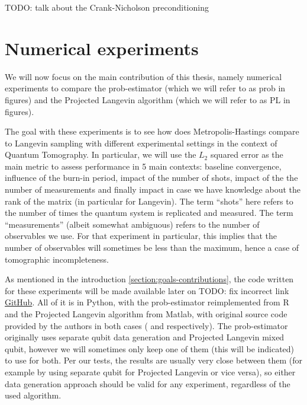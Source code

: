 \documentclass[12pt]{memoir}
\begin{document}
TODO: talk about the Crank-Nicholson preconditioning  



\chapter{Numerical experiments}\label{section:numerical-exp}

We will now focus on the main contribution of this thesis, namely numerical experiments to compare the prob-estimator (which we will refer to as prob in figures) and the Projected Langevin algorithm (which we will refer to as PL in figures).\medbreak

The goal with these experiments is to see how does Metropolis-Hastings compare to Langevin sampling with different experimental settings in the context of Quantum Tomography. In particular, we will use the $L_2$ squared error as the main metric to assess performance in 5 main contexts: baseline convergence, influence of the burn-in period, impact of the number of shots, impact of the the number of measurements and finally impact in case we have knowledge about the rank of the matrix (in particular for Langevin). The term ``shots'' here refers to the number of times the quantum system is replicated and measured. The term ``measurements'' (albeit somewhat ambiguous) refers to the number of observables we use. For that experiment in particular, this implies that the number of observables will sometimes be less than the maximum, hence a case of tomographic incompleteness. \medbreak

As mentioned in the introduction \ref{section:goals-contributions}, the code written for these experiments will be made available later on TODO: fix incorrect link \href{www.github.com/daqwes/thesis}{GitHub}. All of it is in Python, with the prob-estimator reimplemented from R and the Projected Langevin algorithm from Matlab, with original source code provided by the authors in both cases (\cite{MA17} and \cite{meth:bayesian:Langevin:ACMT2024} respectively). The prob-estimator originally uses separate qubit data generation and Projected Langevin mixed qubit, however we will sometimes only keep one of them (this will be indicated) to use for both. Per our tests, the results are usually very close between them (for example by using separate qubit for Projected Langevin or vice versa), so either data generation approach should be valid for any experiment, regardless of the used algorithm.\medbreak
\end{document}
